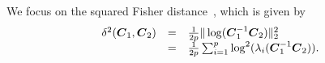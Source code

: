 \documentclass{article}
\theoremstyle{plain}
\theoremstyle{definition}
\theoremstyle{remark}
\begin{document}
We focus on the squared Fisher distance~\cite{skovgaard1984riemannian}, which is given by
\begin{equation}
    \begin{array}{rcl}
        \delta^2(\boldsymbol{C}_1,\boldsymbol{C}_2) & = & \frac1{2p}\| \log(\boldsymbol{C}_1^{-1}\boldsymbol{C}_2) \|_2^2  \\
         & = & \frac1{2p}\sum_{i=1}^{p} \log^2(\lambda_i(\boldsymbol{C}_1^{-1}\boldsymbol{C}_2)).
    \end{array}
\label{eq:Fisher_dist}
\end{equation}
\end{document}
